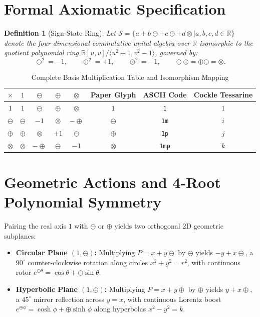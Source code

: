\documentclass[11pt,a4paper]{article}
\newtheorem{definition}{Definition}
\begin{document}
\section{Formal Axiomatic Specification}
\begin{definition}[Sign-State Ring]
Let $\mathcal{S} = \{a + b\ominus + c\oplus + d\otimes \mid a, b, c, d \in \mathbb{R}\}$ denote the four-dimensional commutative unital algebra over $\mathbb{R}$ isomorphic to the quotient polynomial ring $\mathbb{R}[u, v] / \langle u^2 + 1, v^2 - 1 \rangle$, governed by:
\begin{equation}
\ominus^2 = -1, \qquad \oplus^2 = +1, \qquad \otimes^2 = -1, \qquad \ominus\oplus = \oplus\ominus = \otimes.
\end{equation}
\end{definition}

\begin{table}[h]
\centering
\caption{Complete Basis Multiplication Table and Isomorphism Mapping}
\label{tab:mult_iso}
\begin{tabular}{@{}c|cccc||ccc@{}}
\toprule
$\times$ & $1$ & $\ominus$ & $\oplus$ & $\otimes$ & Paper Glyph & ASCII Code & Cockle Tessarine \\
\midrule
$1$ & $1$ & $\ominus$ & $\oplus$ & $\otimes$ & $1$ & \texttt{1} & $1$ \\
$\ominus$ & $\ominus$ & $-1$ & $\otimes$ & $-\oplus$ & $\ominus$ & \texttt{1m} & $i$ \\
$\oplus$ & $\oplus$ & $\otimes$ & $+1$ & $\ominus$ & $\oplus$ & \texttt{1p} & $j$ \\
$\otimes$ & $\otimes$ & $-\oplus$ & $\ominus$ & $-1$ & $\otimes$ & \texttt{1mp} & $k$ \\
\bottomrule
\end{tabular}
\end{table}

\section{Geometric Actions and 4-Root Polynomial Symmetry}
Pairing the real axis $1$ with $\ominus$ or $\oplus$ yields two orthogonal 2D geometric subplanes:
\begin{itemize}
    \item \textbf{Circular Plane $(1, \ominus)$:} Multiplying $P = x + y\ominus$ by $\ominus$ yields $-y + x\ominus$, a $90^\circ$ counter-clockwise rotation along circles $x^2 + y^2 = r^2$, with continuous rotor $e^{\ominus\theta} = \cos\theta + \ominus\sin\theta$.
    \item \textbf{Hyperbolic Plane $(1, \oplus)$:} Multiplying $P = x + y\oplus$ by $\oplus$ yields $y + x\oplus$, a $45^\circ$ mirror reflection across $y = x$, with continuous Lorentz boost $e^{\oplus\phi} = \cosh\phi + \oplus\sinh\phi$ along hyperbolas $x^2 - y^2 = k$.
\end{itemize}
\end{document}
